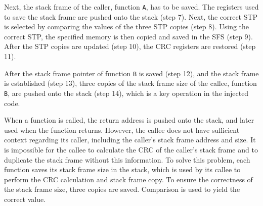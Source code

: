 Next, the stack frame of the caller, function \texttt{A}, has to be saved. The registers used to save the stack frame are pushed onto the stack (step 7). Next, the correct STP is selected by comparing the values of the three STP copies (step 8). Using the correct STP, the specified memory is then copied and saved in the SFS (step 9). After the STP copies are updated (step 10), the CRC registers are restored (step 11).

After the stack frame pointer of function \texttt{B} is saved (step 12), and the stack frame is established (step 13), three copies of the stack frame size of the callee, function \texttt{B}, are pushed onto the stack (step 14), which is a key operation in the injected code. 

When a function is called, the return address is pushed onto the stack, and later used when the function returns. However, the callee does not have sufficient context regarding its caller, including the caller's stack frame address and size. It is impossible for the callee to calculate the CRC of the caller's stack frame and to duplicate the stack frame without this information. To solve this problem, each function saves its stack frame size in the stack, which is used by its callee to perform the CRC calculation and stack frame copy. To ensure the correctness of the stack frame size, three copies are saved. Comparison is used to yield the correct value. 

